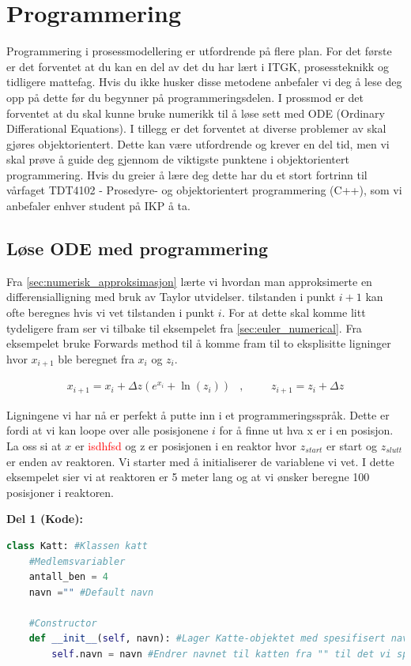 \clearpage
\section{Programmering}\label{sec:prog}
Programmering i prosessmodellering er utfordrende på flere plan. For det første er det forventet at du kan en del av det du har lært i ITGK, prosessteknikk og tidligere mattefag. Hvis du ikke husker disse metodene anbefaler vi deg å lese deg opp på dette før du begynner på programmeringsdelen. I prossmod er det forventet at du skal kunne bruke numerikk til å løse sett med ODE (Ordinary Differational Equations). I tillegg er det forventet at diverse problemer av skal gjøres objektorientert. Dette kan være utfordrende og krever en del tid, men vi skal prøve å guide deg gjennom de viktigste punktene i objektorientert programmering. Hvis du greier å lære deg dette har du et stort fortrinn til vårfaget TDT4102 - Prosedyre- og objektorientert programmering (C++), som vi anbefaler enhver student på IKP å ta.

\subsection{Løse ODE med programmering}
Fra \cref{sec:numerisk_approksimasjon} lærte vi hvordan man approksimerte en differensialligning med bruk av Taylor utvidelser. tilstanden i punkt $i+1$ kan ofte beregnes hvis vi vet tilstanden i punkt $i$. For at dette skal komme litt tydeligere fram ser vi tilbake til eksempelet fra \cref{sec:euler_numerical}. Fra eksempelet bruke Forwards method til å komme fram til to eksplisitte ligninger hvor $x_{i+1}$ ble beregnet fra $x_i$ og $z_i$.

\begin{align}
    \label{eq:eulers_methdo_example2}
    x_{i+1} = x_i +\Delta z(e^{x_i} + \ln (z_i))&, \hspace{1cm} z_{i+1} = z_i + \Delta z
\end{align}

Ligningene vi har nå er perfekt å putte inn i et programmeringsspråk. Dette er fordi at vi kan loope over alle posisjonene $i$ for å finne ut hva x er i en posisjon. La oss si at $x$ er \textcolor{red}{isdhfsd} og z er posisjonen i en reaktor hvor $z_{start}$ er start og $z_{slutt}$ er enden av reaktoren. Vi starter med å initialiserer de variablene vi vet. I dette eksempelet sier vi at reaktoren er 5 meter lang og at vi ønsker beregne 100 posisjoner i reaktoren. 

\textbf{Del 1 (Kode):}
\begin{lstlisting}[language=python]
class Katt: #Klassen katt
    #Medlemsvariabler
    antall_ben = 4 
    navn ="" #Default navn
    
    #Constructor
    def __init__(self, navn): #Lager Katte-objektet med spesifisert navn
        self.navn = navn #Endrer navnet til katten fra "" til det vi spesifiserte

\end{lstlisting}

